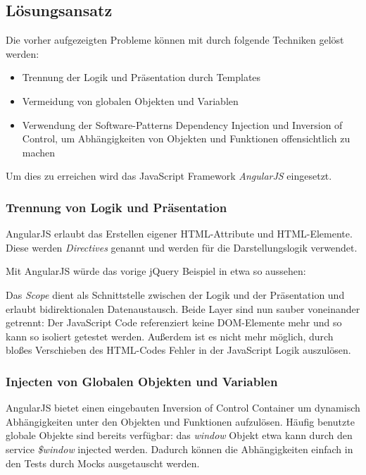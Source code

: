 \documentclass[a4paper,bibtotoc,oneside]{scrbook}
\begin{document}
\subsection{Lösungsansatz}
Die vorher aufgezeigten Probleme können mit durch folgende Techniken gelöst werden:

\begin{itemize}
	\item Trennung der Logik und Präsentation durch Templates
	\item Vermeidung von globalen Objekten und Variablen
	\item Verwendung der Software-Patterns Dependency Injection und Inversion of Control, um Abhängigkeiten von Objekten und Funktionen offensichtlich zu machen
\end{itemize}

Um dies zu erreichen wird das JavaScript Framework \emph{AngularJS}\cite{angular} eingesetzt.

\subsubsection{Trennung von Logik und Präsentation}
AngularJS erlaubt das Erstellen eigener HTML-Attribute und HTML-Elemente. Diese werden \emph{Directives} genannt und werden für die Darstellungslogik verwendet.

Mit AngularJS würde das vorige jQuery Beispiel in etwa so aussehen:




Das \emph{Scope} dient als Schnittstelle zwischen der Logik und der Präsentation und erlaubt bidirektionalen Datenaustausch. Beide Layer sind nun sauber voneinander getrennt: Der JavaScript Code referenziert keine DOM-Elemente mehr und so kann so isoliert getestet werden. Außerdem ist es nicht mehr möglich, durch bloßes Verschieben des HTML-Codes Fehler in der JavaScript Logik auszulösen.


\subsubsection{Injecten von Globalen Objekten und Variablen}
AngularJS bietet einen eingebauten Inversion of Control Container um dynamisch Abhängigkeiten unter den Objekten und Funktionen aufzulösen. Häufig benutzte globale Objekte sind bereits verfügbar: das \emph{window} Objekt etwa kann durch den service \emph{\$window} injected werden. Dadurch können die Abhängigkeiten einfach in den Tests durch Mocks ausgetauscht werden.
\end{document}
